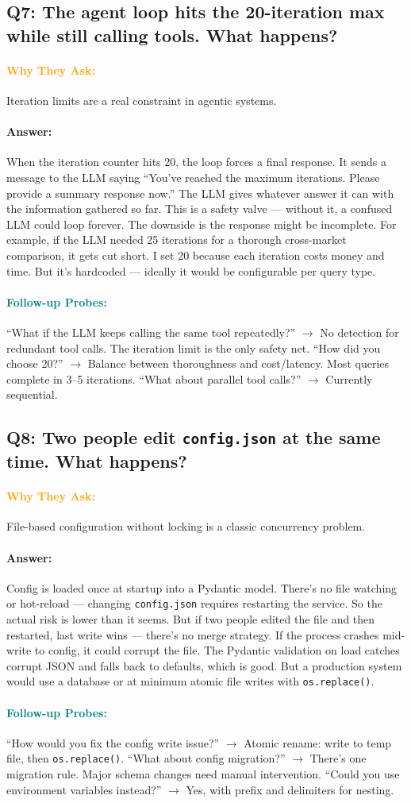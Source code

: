 \documentclass[11pt,a4paper]{article}
\newcommand{\Q}[1]{\subsection{#1}}
\newcommand{\Ans}[1]{\paragraph{\textbf{Answer:}} #1}
\newcommand{\Why}{\paragraph{\textcolor{orange}{\textbf{Why They Ask:}}}}
\newcommand{\Probe}{\paragraph{\textcolor{teal}{\textbf{Follow-up Probes:}}}}
\begin{document}
\Q{Q7: The agent loop hits the 20-iteration max while still calling tools. What happens?}
\Why Iteration limits are a real constraint in agentic systems.
\Ans When the iteration counter hits 20, the loop forces a final response. It sends a message to the LLM saying ``You've reached the maximum iterations. Please provide a summary response now.'' The LLM gives whatever answer it can with the information gathered so far. This is a safety valve --- without it, a confused LLM could loop forever. The downside is the response might be incomplete. For example, if the LLM needed 25 iterations for a thorough cross-market comparison, it gets cut short. I set 20 because each iteration costs money and time. But it's hardcoded --- ideally it would be configurable per query type.
\Probe ``What if the LLM keeps calling the same tool repeatedly?'' $\rightarrow$ No detection for redundant tool calls. The iteration limit is the only safety net. ``How did you choose 20?'' $\rightarrow$ Balance between thoroughness and cost/latency. Most queries complete in 3--5 iterations. ``What about parallel tool calls?'' $\rightarrow$ Currently sequential.

\Q{Q8: Two people edit \texttt{config.json} at the same time. What happens?}
\Why File-based configuration without locking is a classic concurrency problem.
\Ans Config is loaded once at startup into a Pydantic model. There's no file watching or hot-reload --- changing \texttt{config.json} requires restarting the service. So the actual risk is lower than it seems. But if two people edited the file and then restarted, last write wins --- there's no merge strategy. If the process crashes mid-write to config, it could corrupt the file. The Pydantic validation on load catches corrupt JSON and falls back to defaults, which is good. But a production system would use a database or at minimum atomic file writes with \texttt{os.replace()}.
\Probe ``How would you fix the config write issue?'' $\rightarrow$ Atomic rename: write to temp file, then \texttt{os.replace()}. ``What about config migration?'' $\rightarrow$ There's one migration rule. Major schema changes need manual intervention. ``Could you use environment variables instead?'' $\rightarrow$ Yes, with prefix and delimiters for nesting.
\end{document}
